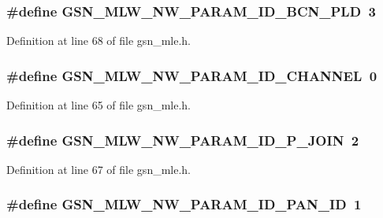 \hypertarget{a00527_ae0dbbcbb5be346aebf25a8c8193ce685}{
\subsubsection[{GSN\_\-MLW\_\-NW\_\-PARAM\_\-ID\_\-BCN\_\-PLD}]{\setlength{\rightskip}{0pt plus 5cm}\#define GSN\_\-MLW\_\-NW\_\-PARAM\_\-ID\_\-BCN\_\-PLD~3}}
\label{a00527_ae0dbbcbb5be346aebf25a8c8193ce685}


Definition at line 68 of file gsn\_\-mle.h.

\hypertarget{a00527_ae65b696d76d0b202bce2451e38f183ed}{
\subsubsection[{GSN\_\-MLW\_\-NW\_\-PARAM\_\-ID\_\-CHANNEL}]{\setlength{\rightskip}{0pt plus 5cm}\#define GSN\_\-MLW\_\-NW\_\-PARAM\_\-ID\_\-CHANNEL~0}}
\label{a00527_ae65b696d76d0b202bce2451e38f183ed}


Definition at line 65 of file gsn\_\-mle.h.

\hypertarget{a00527_afd6e248344b7cbbd90817a553acadbb0}{
\subsubsection[{GSN\_\-MLW\_\-NW\_\-PARAM\_\-ID\_\-P\_\-JOIN}]{\setlength{\rightskip}{0pt plus 5cm}\#define GSN\_\-MLW\_\-NW\_\-PARAM\_\-ID\_\-P\_\-JOIN~2}}
\label{a00527_afd6e248344b7cbbd90817a553acadbb0}


Definition at line 67 of file gsn\_\-mle.h.

\hypertarget{a00527_aecfc12d703e039ff9fefc611122030a2}{
\subsubsection[{GSN\_\-MLW\_\-NW\_\-PARAM\_\-ID\_\-PAN\_\-ID}]{\setlength{\rightskip}{0pt plus 5cm}\#define GSN\_\-MLW\_\-NW\_\-PARAM\_\-ID\_\-PAN\_\-ID~1}}
\label{a00527_aecfc12d703e039ff9fefc611122030a2}


